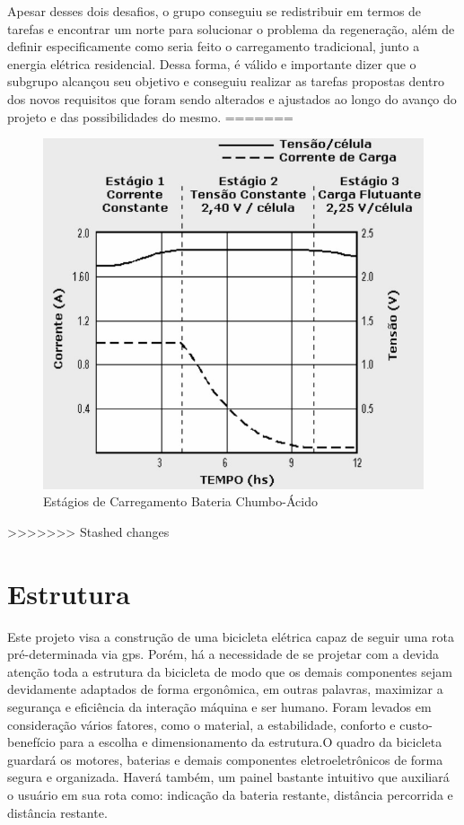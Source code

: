 	Apesar desses dois desafios, o grupo conseguiu se redistribuir em termos de tarefas e encontrar um norte para solucionar o problema da regeneração, além de definir especificamente como seria feito o carregamento tradicional, junto a energia elétrica residencial. Dessa forma, é válido e importante dizer que o subgrupo alcançou seu objetivo e conseguiu realizar as tarefas propostas dentro dos novos requisitos que foram sendo alterados e ajustados ao longo do avanço do projeto e das possibilidades do mesmo. 
=======
	\begin{figure}[H]
		\centering
		\includegraphics[scale=0.4]{estagio_carregamento.jpeg}
		\caption{Estágios de Carregamento Bateria Chumbo-Ácido}
		\label{img:estagiocarregamento}
	\end{figure}
>>>>>>> Stashed changes


  \section{Estrutura}
  Este projeto visa a construção de uma bicicleta elétrica capaz de seguir uma rota pré-determinada via gps. Porém, há a necessidade de se projetar com a devida atenção toda a estrutura da bicicleta de modo que os demais componentes sejam devidamente adaptados de forma ergonômica, em outras palavras, maximizar a segurança e eficiência da interação máquina e ser humano.
Foram levados em consideração vários fatores, como o material, a estabilidade, conforto e custo-benefício para a escolha e dimensionamento da estrutura.O quadro da bicicleta guardará os motores, baterias e demais componentes eletroeletrônicos de forma segura e organizada. Haverá também, um painel bastante intuitivo que auxiliará o usuário em sua rota como: indicação da bateria restante, distância percorrida e distância restante.

